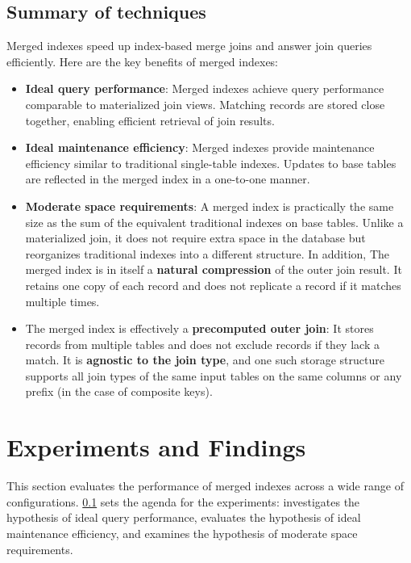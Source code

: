 \documentclass[biblatex, english]{lni}
\begin{document}
\subsection{Summary of techniques}\label{ssec:techniques-summary}

Merged indexes speed up index-based merge joins and answer join queries efficiently.
Here are the key benefits of merged indexes:

\begin{itemize}
    \item \textbf{Ideal query performance}: Merged indexes achieve query performance comparable to materialized join views. Matching records are stored close together, enabling efficient retrieval of join results.
    \item \textbf{Ideal maintenance efficiency}: Merged indexes provide maintenance efficiency similar to traditional single-table indexes. Updates to base tables are reflected in the merged index in a one-to-one manner.
    \item \textbf{Moderate space requirements}: A merged index is practically the same size as the sum of the equivalent traditional indexes on base tables. Unlike a materialized join, it does not require extra space in the database but reorganizes traditional indexes into a different structure. In addition, The merged index is in itself a \textbf{natural compression} of the outer join result.
    It retains one copy of each record and does not replicate a record if it matches multiple times.
    \item The merged index is effectively a \textbf{precomputed outer join}:
    It stores records from multiple tables and does not exclude records if they lack a match. It is \textbf{agnostic to the join type}, and one such storage structure supports all join types of the same input tables on the same columns or any prefix (in the case of composite keys).
\end{itemize}

\section{Experiments and Findings}\label{sec:exp}

This section evaluates the performance of merged indexes across a wide range of configurations.
\cref{ssec:techniques-summary} sets the agenda for the experiments:
 investigates the hypothesis of ideal query performance,
 evaluates the hypothesis of ideal maintenance efficiency, and
 examines the hypothesis of moderate space requirements.
\end{document}

